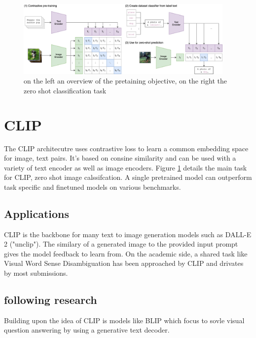 \documentclass[11pt,a4paper]{article}
\begin{document}
\begin{figure}[t]
  \centering
  \includegraphics[width=0.95\textwidth]{CLIP.png}
  \caption{on the left an overview of the pretaining objective, on the right the zero shot classification task}
  \label{fig:clip}
\end{figure}

\section{CLIP} %
The CLIP \cite{radford2021learning} architecutre uses contrastive loss to learn a common embedding space for image, text pairs.
It's based on consine similarity and can be used with a variety of text encoder as well as image encoders.
Figure \ref*{fig:clip} details the main task for CLIP, zero shot image calssifcation.
A single pretrained model can outperform task specific and finetuned models on various benchmarks.


\subsection{Applications} %
CLIP is the backbone for many text to image generation models such as DALL-E 2 \cite{ramesh2022hierarchical} ("unclip").
The similary of a generated image to the provided input prompt gives the model feedback to learn from.
On the academic side, a shared task like Visual Word Sense Disambiguation \cite{raganato-etal-2023-semeval} has been approached by CLIP and drivates by most submissions.

\subsection{following research} %
Building upon the idea of CLIP is models like BLIP\cite{li2022blip} which focus to sovle visual question answering by using a generative text decoder.




\appendix
\end{document}
